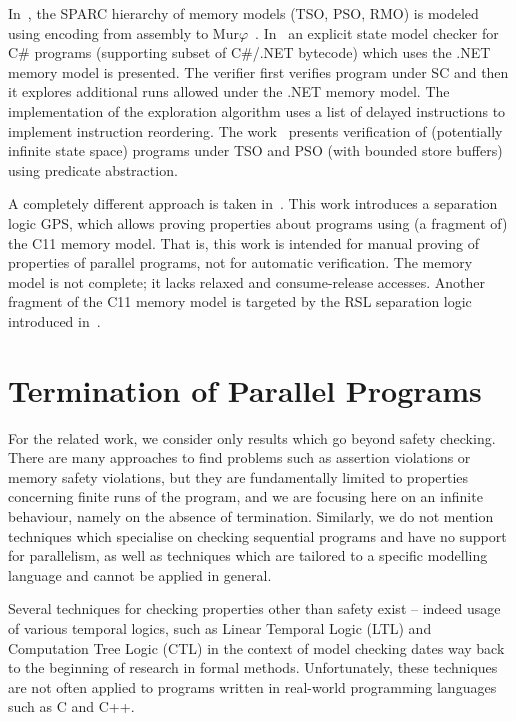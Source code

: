 In~\cite{Park1995}, the SPARC hierarchy of memory models (TSO, PSO, RMO) is modeled using encoding from assembly to Mur\(\varphi\)~\cite{Murphi}.
In~\cite{Huynh2006} an explicit state model checker for C\# programs (supporting subset of C\#/.NET bytecode) which uses the .NET memory model is presented.
The verifier first verifies program under SC and then it explores additional runs allowed under the .NET memory model.
The implementation of the exploration algorithm uses a list of delayed instructions to implement instruction reordering.
The work~\cite{Dan2013} presents verification of (potentially infinite state space) programs under TSO and PSO (with bounded store buffers) using predicate abstraction.

A completely different approach is taken in~\cite{Turon2014}.
This work introduces a separation logic GPS, which allows proving properties about programs using (a fragment of) the C11 memory model.
That is, this work is intended for manual proving of properties of parallel programs, not for automatic verification.
The memory model is not complete; it lacks relaxed and consume-release accesses.
Another fragment of the C11 memory model is targeted by the RSL separation logic introduced in~\cite{Vafeiadis2013}.

\section{Termination of Parallel Programs}

For the related work, we consider only results which go beyond safety checking.
There are many approaches to find problems such as assertion violations or memory safety violations, but they are fundamentally limited to properties concerning finite runs of the program, and we are focusing here on an infinite behaviour, namely on the absence of termination.
Similarly, we do not mention techniques which specialise on checking sequential programs and have no support for parallelism, as well as techniques which are tailored to a specific modelling language and cannot be applied in general.

Several techniques for checking properties other than safety exist -- indeed
usage of various temporal logics, such as Linear Temporal Logic (LTL)
\cite[Chapter 5]{PoMC} and Computation Tree Logic (CTL) \cite[Chapter 6]{PoMC} in the context of model checking dates way back to the beginning of research in formal methods.
Unfortunately, these techniques are not often applied to programs written in real-world programming languages such as C and C++.

